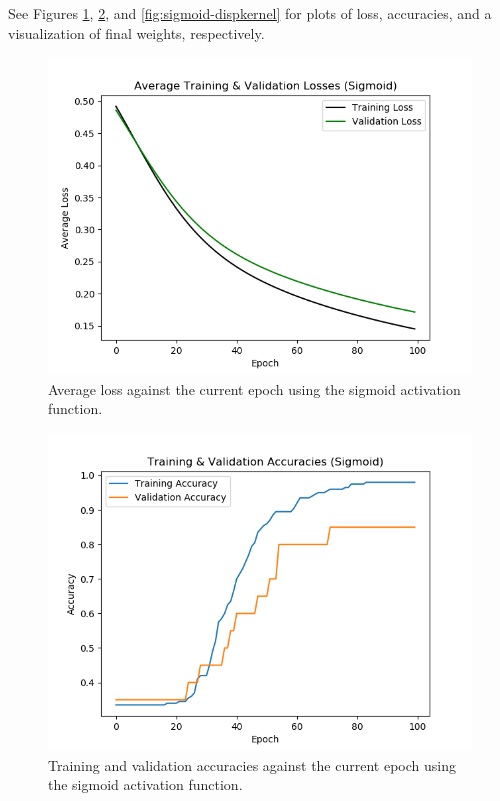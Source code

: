 \documentclass{article}
\begin{document}
\begin{enumerate}
\begin{enumerate}
                See Figures \ref{fig:sigmoid-loss},
                \ref{fig:sigmoid-accuracies}, and
                \ref{fig:sigmoid-dispkernel}
                for plots of loss, accuracies, and a visualization of final weights,
                respectively.
                \begin{figure}[ht]
                  \begin{center}
                    \includegraphics[width=0.7\linewidth]{figures/sigmoid-loss.png}
                    \caption{Average loss against the current epoch using the sigmoid
                      activation function.}
                    \label{fig:sigmoid-loss}
                  \end{center}
                \end{figure}
                \begin{figure}[ht]
                  \begin{center}
                    \includegraphics[width=0.7\linewidth]{figures/sigmoid-accuracies.png}
                    \caption{Training and validation accuracies against the current epoch
                      using the sigmoid activation function.}
                    \label{fig:sigmoid-accuracies}

\end{center}
\end{figure}
\end{enumerate}
\end{enumerate}
\end{document}
